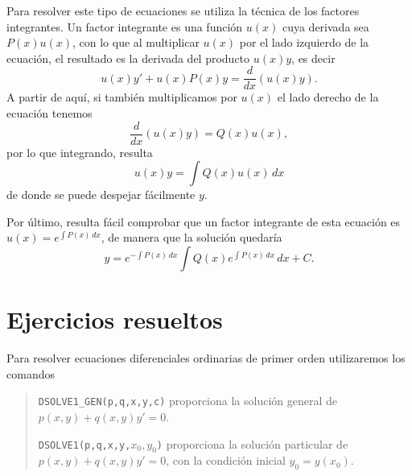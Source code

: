 Para resolver este tipo de ecuaciones se utiliza la técnica de los factores integrantes. 
Un factor integrante es una función $u(x)$ cuya derivada sea $P(x)u(x)$, con lo que al multiplicar $u(x)$ por el lado
izquierdo de la ecuación, el resultado es la derivada del producto $u(x)y$, es decir
\[
u(x)y'+u(x)P(x)y=\frac{d}{dx}(u(x)y).
\]
A partir de aquí, si también multiplicamos por $u(x)$ el lado derecho de la ecuación tenemos
\[
\frac{d}{dx}(u(x)y)=Q(x)u(x),
\]
por lo que integrando, resulta
\[
u(x)y=\int Q(x)u(x)\,dx
\]
de donde se puede despejar fácilmente $y$.

Por último, resulta fácil comprobar que un factor integrante de esta ecuación es $u(x)=e^{\int P(x)\, dx}$, de manera
que la solución quedaría
\[
y=e^{-\int P(x)\,dx}\int Q(x)e^{\int P(x)\,dx}\,dx+C.
\]

\newpage

\section{Ejercicios resueltos}
\begin{indicacion}
Para resolver ecuaciones diferenciales ordinarias de primer orden utilizaremos los comandos
\begin{quote}
\texttt{DSOLVE1\_GEN(p,q,x,y,c)} proporciona la solución general de $p(x,y)+q(x,y)y'=0$.

\texttt{DSOLVE1(p,q,x,y,$x_{0},y_{0}$)} proporciona la solución particular de $p(x,y)+q(x,y)y'=0$, con la condición inicial $y_{0}=y(x_{0})$.
\end{quote}
\end{indicacion}

